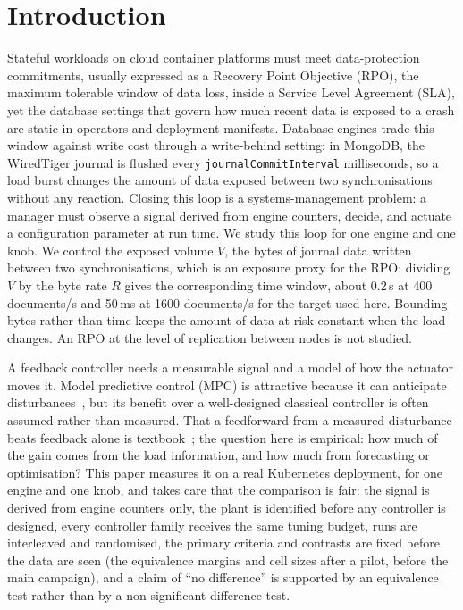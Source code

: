 \documentclass[smallextended]{svjour3}
\begin{document}
\section{Introduction}\label{sec:intro}
Stateful workloads on cloud container platforms must meet data-protection
commitments, usually expressed as a Recovery Point Objective (RPO), the
maximum tolerable window of data loss, inside a Service Level Agreement (SLA),
yet the database settings that govern how much recent data is exposed to a crash
are static in operators and deployment manifests.
Database engines trade this window against write cost through a write-behind
setting: in MongoDB, the WiredTiger journal is flushed every
\texttt{journalCommitInterval} milliseconds, so a load burst changes the amount of data
exposed between two synchronisations without any reaction. Closing this loop is a
systems-management problem: a manager must observe a signal derived from engine
counters, decide, and actuate a configuration parameter at run time. We study this
loop for one engine and one knob. We control the exposed
volume $V$, the bytes of journal data written between two synchronisations, which is an exposure proxy for the RPO: dividing $V$ by the byte rate $R$ gives
the corresponding time window, about 0.2\,s at 400 documents/s and 50\,ms at 1600 documents/s for the target used here. Bounding bytes rather than time keeps the
amount of data at risk constant when the load changes. An RPO at the level of replication between nodes is not studied.

A feedback controller needs a measurable signal and a model of how the
actuator moves it. Model predictive control (MPC) is attractive because it can
anticipate disturbances~\cite{camacho2013model}, but its benefit over a
well-designed classical controller is often assumed rather than measured. That a
feedforward from a measured disturbance beats feedback alone is textbook~\cite{astrom2008feedback};
the question here is empirical: how much of the gain comes from the load information, and how much from forecasting or optimisation? This
paper measures it on a real Kubernetes deployment, for one engine and one knob, and takes care
that the comparison is fair: the signal is derived from engine counters only,
the plant is identified before any controller is designed, every controller
family receives the same tuning budget, runs are interleaved and randomised, the primary criteria and
contrasts are fixed before the data are seen (the equivalence margins and cell sizes after a pilot, before the main campaign), and a claim of ``no difference'' is
supported by an equivalence test rather than by a non-significant difference test.
\end{document}
